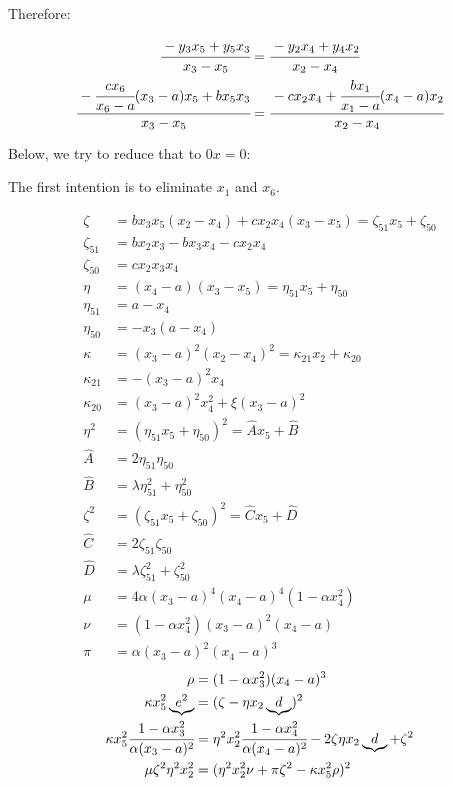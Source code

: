 \documentclass[12pt]{article}
\numberwithin{table}{section}
\begin{document}
\newpage

Therefore:

\begin{align}
\cfrac{-y_3 x_5 + y_5 x_3}{x_3 - x_5} &= \cfrac{-y_2 x_4 + y_4 x_2}{x_2 - x_4} \label{eq20} \\
\cfrac{-\cfrac{cx_6}{x_6 - a}(x_3-a) x_5 + b x_5 x_3}{x_3 - x_5} &= \cfrac{-cx_2 x_4 + \cfrac{bx_1}{x_1 - a}(x_4-a) x_2}{x_2 - x_4} 
\end{align}

Below, we try to reduce that to $0x = 0$:

The first intention is to eliminate $x_1$ and $x_6$.

\begin{align}
\zeta &= b x_3 x_5 (x_2 - x_4) + cx_2 x_4(x_3 - x_5) = \zeta_{51} x_5 + \zeta_{50} \\
\zeta_{51} &= bx_2x_3 - b x_3x_4 - cx_2 x_4 \\
\zeta_{50} &= cx_2 x_3 x_4 \\
\eta &= (x_4-a) (x_3 - x_5) = \eta_{51} x_5 + \eta_{50} \\
\eta_{51} &= a - x_4 \\
\eta_{50} &= -x_3 (a - x_4)\\
\kappa &= (x_3-a)^2 (x_2 - x_4)^2 =\kappa_{21} x_2 + \kappa_{20} \\
\kappa_{21} &= - (x_3-a)^2 x_4\\
\kappa_{20} &= (x_3-a)^2 x_4^2 + \xi (x_3-a)^2\\
\eta^2 &= (\eta_{51} x_5 + \eta_{50})^2 = \hat A x_5 + \hat B \\
\hat A &= 2\eta_{51}\eta_{50} \\
\hat B &= \lambda \eta_{51}^2 + \eta_{50}^2\\
\zeta^2 &= (\zeta_{51} x_5 + \zeta_{50})^2  = \hat C x_5 + \hat D\\
\hat C &= 2\zeta_{51}\zeta_{50} \\
\hat D &= \lambda \zeta_{51}^2 + \zeta_{50}^2 \\
\mu &= 4\alpha (x_3 - a)^4 (x_4 - a)^4(1 - \alpha x_4^2 ) \\
\nu &= (1 - \alpha x_4^2)(x_3-a)^2(x_4-a)\\
\pi &= \alpha (x_3-a)^2(x_4-a)^3
\end{align}
\begin{align}
\rho &= (1 - \alpha x_3^2 )(x_4-a)^3\\
\kappa x_5^2 \underbrace{e^2} &= (\zeta - \eta x_2 \underbrace{d})^2 \\ 
\kappa x_5^2 \cfrac{1 - \alpha x_3^2 }{\alpha (x_3-a)^2} &= \eta^2 x_2^2 \cfrac{1 - \alpha x_4^2 }{\alpha (x_4-a)^2} - 2 \zeta \eta x_2 \underbrace{d} + \zeta^2 \\
 \mu \zeta^2 \eta^2 x_2^2  &= (\eta^2 x_2^2 \nu  + \pi \zeta^2 - \kappa x_5^2 \rho)^2 
\end{align}
\end{document}

